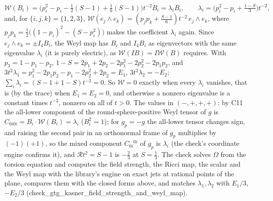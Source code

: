 \[
\mathcal{W}(B_{i}) = \bigl(p_{i}^{2} - p_{i} - \tfrac12(S - 1) + \tfrac16(S - 1)\bigr)t^{-2}B_{i} = \lambda_{i}B_{i}, \qquad \lambda_{i} = \bigl(p_{i}^{2} - p_{i} + \tfrac{1 - S}{3}\bigr)t^{-2},
\]
and, for $\{i, j, k\} = \{1, 2, 3\}$, $\mathcal{W}(e_{j}\wedge e_{k}) = (p_{j}p_{k} + \tfrac{S - 1}{6})t^{-2}\,e_{j}\wedge e_{k}$, where $p_{j}p_{k} = \tfrac12\bigl((1 - p_{i})^{2} - (S - p_{i}^{2})\bigr)$ makes the coefficient $\lambda_{i}$ again. Since $e_{j}\wedge e_{k} = \pm I_{4}B_{i}$, the Weyl map has $B_{i}$ and $I_{4}B_{i}$ as eigenvectors with the same eigenvalue $\lambda_{i}$ (it is purely electric), as $\mathcal{W}(IB) = I\mathcal{W}(B)$ requires. With $p_{3} = 1 - p_{1} - p_{2}$, $1 - S = 2p_{1} + 2p_{2} - 2p_{1}^{2} - 2p_{2}^{2} - 2p_{1}p_{2}$, and $3t^{2}\lambda_{1} = p_{1}^{2} - 2p_{1}p_{2} - p_{1} - 2p_{2}^{2} + 2p_{2} = E_{1}$, $3t^{2}\lambda_{2} = -E_{2}$; $\sum_{i}\lambda_{i} = (S - 1 + 1 - S)t^{-2} = 0$. So $\mathcal{W} = 0$ exactly when every $\lambda_{i}$ vanishes, that is (by the trace) when $E_{1} = E_{2} = 0$, and otherwise a nonzero eigenvalue is a constant times $t^{-2}$, nonzero on all of $t > 0$. The values in $(-,+,+,+)$: by C11 the all-lower component of the round-sphere-positive Weyl tensor of $g$ is $C_{0i0i} = B_{i}\cdot\mathcal{W}(B_{i}) = \lambda_{i}$ ($B_{i}^{2} = 1$); for $g_{p} = -g$ the all-lower tensor changes sign, and raising the second pair in an orthonormal frame of $g_{p}$ multiplies by $(-1)(+1)$, so the mixed component $C_{0i}{}^{0i}$ of $g_{p}$ is $\lambda_{i}$ (the check's coordinate engine confirms it), and $\mathcal{R}t^{2} = S - 1$ is $-\tfrac23$ at $S = \tfrac13$. The check solves $\Omega$ from the torsion equation and computes the field strength, the Ricci map, the scalar and the Weyl map with the library's engine on exact jets at rational points of the plane, compares them with the closed forms above, and matches $\lambda_{1}, \lambda_{2}$ with $E_{1}/3$, $-E_{2}/3$ (check\_gtg\_kasner\_field\_strength\_and\_weyl\_map).

